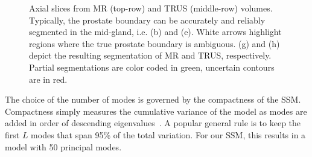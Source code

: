 \documentclass[journal]{IEEEtran}
\begin{document}
\begin{figure}[t]
	\hspace*{0.75cm}
	\hfill
	\hspace*{0.75cm}
  \caption{Axial slices from MR (top-row) and TRUS (middle-row) volumes. Typically, the prostate boundary can be accurately and reliably segmented in the mid-gland, i.e. (b) and (e). White arrows highlight regions where the true prostate boundary is ambiguous. (g) and (h) depict the resulting segmentation of MR and TRUS, respectively. Partial segmentations are color coded in green, uncertain contours are in red.}\label{fig:biopsy1}
\end{figure}

The choice of the number of modes is governed by the compactness of the SSM. Compactness simply measures the cumulative variance of the model as modes are added in order of descending eigenvalues~\cite{Heimann09a}. A popular general rule is to keep the first $L$ modes that span 95\% of the total variation. For our SSM, this results in a model with 50 principal modes.
\end{document}
